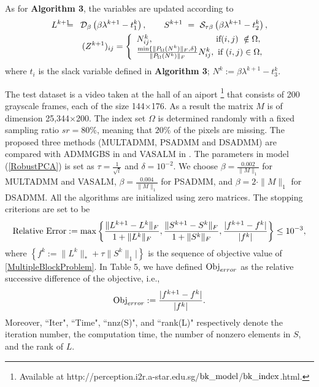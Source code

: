 \documentclass{mcom-l}
\theoremstyle{definition}
\theoremstyle{remark}
\numberwithin{equation}{section}
\begin{document}
As for {\bf{Algorithm 3}}, the variables are updated according to
\begin{eqnarray}\label{subAlg3RPCA}
L^{k+1} \!\!\!\!&=&\!\!\!\! {\mathcal{D}}_{\beta}\left( \beta \lambda^{k+1} - t_1^k \right),\qquad S^{k+1}\ =\ {\mathcal{S}}_{\tau\beta}\left( \beta \lambda^{k+1} - t_2^k \right),\nonumber\\
&&(Z^{k+1})_{ij}= \left\{\begin{array}{l}
                        N^k_{ij},\qquad\qquad\qquad\quad\  \hbox{if} (i,j)\ \notin\Omega,\\
                        \frac{\min\{\|P_{\Omega}(N^k)\|_F,\delta\}}{\|P_{\Omega}(N^k)\|_F} N_{ij}^k,\ \hbox{if}\  (i,j)\in \Omega, \\
                        \end{array}\right.\nonumber
\end{eqnarray}
where $t_i$ is the slack variable defined in {\bf{Algorithm 3}}; $N^k := \beta \lambda^{k+1} - t_3^k$.

The test dataset is a video taken at the hall of an aiport \footnote{Available at http://perception.i2r.a-star.edu.sg/$\hbox{bk}\_\hbox{model}$/$\hbox{bk}\_\hbox{index}$.html.} that consists of 200 grayscale frames, each of the size 144$\times$176. As a result the matrix $M$ is of dimension 25,344$\times$200. The index set $\Omega$ is determined randomly with a fixed sampling ratio $sr=80\%$, meaning that $20\%$ of the pixels are missing. The proposed three methods (MULTADMM, PSADMM and DSADMM) are compared with ADMMGBS in \cite{HeTaoYuan2012} and VASALM in \cite{TaoYuan2011}. The parameters in model (\ref{RobustPCA}) is set as $\tau = \frac{1}{\sqrt{l}}$ and $\delta = 10^{-2}$. We choose $\beta = \frac{0.002}{\|M\|_1}$ for MULTADMM and VASALM, $\beta = \frac{0.004}{\|M\|_1}$ for PSADMM, and $\beta = 2\cdot\|M\|_1$ for DSADMM. All the algorithms are initialized using zero matrices. The stopping criterions are set to be
$$
\hbox{Relative Error}:=\max \left\{\frac{\| L^{k+1} - L^k \|_F}{1 + \|L^k\|_F},\frac{\| S^{k+1} - S^k \|_F}{1 + \|S^k\|_F}, \frac{|f^{k+1} - f^k|}{|f^k|}\right\}\le 10^{-3},
$$
where $\left\{f^k := \|L^k\|_* + \tau \|S^k\|_1|\right\}$ is the sequence of objective value of \eqref{MultipleBlockProblem}.
In Table 5, we have defined $\hbox{Obj}_{error}$ as the relative successive difference of the objective, i.e.,
$$\hbox{Obj}_{error} := \frac{|f^{k+1} - f^k|}{|f^k|}.$$
Moreover, ``Iter", ``Time", ``nnz(S)", and ``rank(L)" respectively denote the iteration number, the computation time, the number of nonzero elements in $S$, and the rank of $L$.
\end{document}
